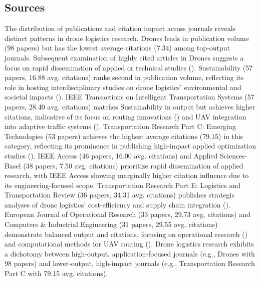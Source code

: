 \documentclass{article}
\begin{document}
\subsection{Sources}
The distribution of publications and citation impact across journals reveals distinct patterns in drone logistics research. Drones leads in publication volume (98 papers) but has the lowest average citations (7.34) among top-output journals. Subsequent examination of highly cited articles in Drones suggests a focus on rapid dissemination of applied or technical studies (\cite{WOS:000682822500001, WOS:000682822500021}). Sustainability (57 papers, 16.88 avg. citations) ranks second in publication volume, reflecting its role in hosting interdisciplinary studies on drone logistics' environmental and societal impacts (\cite{WOS:000531558100214, WOS:000428567100315}). IEEE Transactions on Intelligent Transportation Systems (57 papers, 28.40 avg. citations) matches Sustainability in output but achieves higher citations, indicative of its focus on routing innovations (\cite{WOS:000658360600026}) and UAV integration into adaptive traffic systems (\cite{WOS:000684003100038}). Transportation Research Part C: Emerging Technologies (53 papers) achieves the highest average citations (79.15) in this category, reflecting its prominence in publishing high-impact applied optimization studies (\cite{WOS:000353871700006, WOS:000425566000035}). IEEE Access (46 papers, 16.00 avg. citations) and Applied Sciences-Basel (38 papers, 7.50 avg. citations) prioritize rapid dissemination of applied research, with IEEE Access showing marginally higher citation influence due to its engineering-focused scope. Transportation Research Part E: Logistics and Transportation Review (36 papers, 34.31 avg. citations) publishes strategic analyses of drone logistics' cost-efficiency and supply chain integration (\cite{WOS:000488423300001}). European Journal of Operational Research (33 papers, 29.73 avg. citations) and Computers \& Industrial Engineering (31 papers, 29.55 avg. citations) demonstrate balanced output and citations, focusing on operational research (\cite{WOS:000742554100008}) and computational methods for UAV routing (\cite{WOS:000460496000002}). Drone logistics research exhibits a dichotomy between high-output, application-focused journals (e.g., Drones with 98 papers) and lower-output, high-impact journals (e.g., Transportation Research Part C with 79.15 avg. citations).
\end{document}
